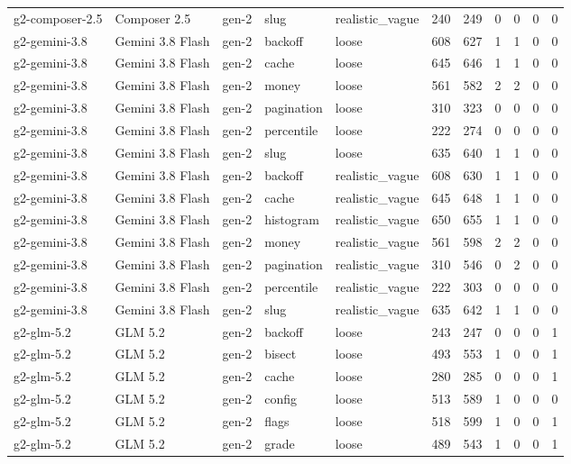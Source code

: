 \begin{tabular}{lllllllllll}
g2-composer-2.5 & Composer 2.5 & gen-2 & slug & realistic\_vague & 240 & 249 & 0 & 0 & 0 & 0 \\
g2-gemini-3.8 & Gemini 3.8 Flash & gen-2 & backoff & loose & 608 & 627 & 1 & 1 & 0 & 0 \\
g2-gemini-3.8 & Gemini 3.8 Flash & gen-2 & cache & loose & 645 & 646 & 1 & 1 & 0 & 0 \\
g2-gemini-3.8 & Gemini 3.8 Flash & gen-2 & money & loose & 561 & 582 & 2 & 2 & 0 & 0 \\
g2-gemini-3.8 & Gemini 3.8 Flash & gen-2 & pagination & loose & 310 & 323 & 0 & 0 & 0 & 0 \\
g2-gemini-3.8 & Gemini 3.8 Flash & gen-2 & percentile & loose & 222 & 274 & 0 & 0 & 0 & 0 \\
g2-gemini-3.8 & Gemini 3.8 Flash & gen-2 & slug & loose & 635 & 640 & 1 & 1 & 0 & 0 \\
g2-gemini-3.8 & Gemini 3.8 Flash & gen-2 & backoff & realistic\_vague & 608 & 630 & 1 & 1 & 0 & 0 \\
g2-gemini-3.8 & Gemini 3.8 Flash & gen-2 & cache & realistic\_vague & 645 & 648 & 1 & 1 & 0 & 0 \\
g2-gemini-3.8 & Gemini 3.8 Flash & gen-2 & histogram & realistic\_vague & 650 & 655 & 1 & 1 & 0 & 0 \\
g2-gemini-3.8 & Gemini 3.8 Flash & gen-2 & money & realistic\_vague & 561 & 598 & 2 & 2 & 0 & 0 \\
g2-gemini-3.8 & Gemini 3.8 Flash & gen-2 & pagination & realistic\_vague & 310 & 546 & 0 & 2 & 0 & 0 \\
g2-gemini-3.8 & Gemini 3.8 Flash & gen-2 & percentile & realistic\_vague & 222 & 303 & 0 & 0 & 0 & 0 \\
g2-gemini-3.8 & Gemini 3.8 Flash & gen-2 & slug & realistic\_vague & 635 & 642 & 1 & 1 & 0 & 0 \\
g2-glm-5.2 & GLM 5.2 & gen-2 & backoff & loose & 243 & 247 & 0 & 0 & 0 & 1 \\
g2-glm-5.2 & GLM 5.2 & gen-2 & bisect & loose & 493 & 553 & 1 & 0 & 0 & 1 \\
g2-glm-5.2 & GLM 5.2 & gen-2 & cache & loose & 280 & 285 & 0 & 0 & 0 & 1 \\
g2-glm-5.2 & GLM 5.2 & gen-2 & config & loose & 513 & 589 & 1 & 0 & 0 & 0 \\
g2-glm-5.2 & GLM 5.2 & gen-2 & flags & loose & 518 & 599 & 1 & 0 & 0 & 1 \\
g2-glm-5.2 & GLM 5.2 & gen-2 & grade & loose & 489 & 543 & 1 & 0 & 0 & 1 \\

\end{tabular}
